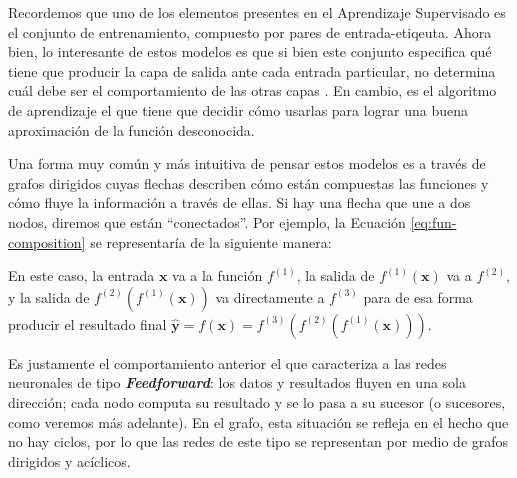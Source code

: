 \documentclass[../../main.tex]{subfiles}
\begin{document}
Recordemos que uno de los elementos presentes en el Aprendizaje Supervisado es el conjunto
de entrenamiento, compuesto por pares de entrada-etiqeuta. Ahora bien, lo interesante de
estos modelos es que si bien este conjunto especifica qué tiene que producir la capa de
salida ante cada entrada particular, no determina cuál debe ser el comportamiento de las
otras capas \cite{deep-learning}. En cambio, es el algoritmo de aprendizaje el que tiene
que decidir cómo usarlas para lograr una buena aproximación de la función desconocida.

Una forma muy común y más intuitiva de pensar estos modelos es a través de grafos
dirigidos cuyas flechas describen cómo están compuestas las funciones y cómo fluye la
información a través de ellas. Si hay una flecha que une a dos nodos, diremos que están
``conectados''. Por ejemplo, la Ecuación \ref{eq:fun-composition} se representaría de la
siguiente manera:
\begin{center}
\end{center}

En este caso, la entrada \(\bm{x}\) va a la función \(f^{(1)}\), la salida de
\(f^{(1)}(\bm{x})\) va a \(f^{(2)}\), y la salida de \(f^{(2)}(f^{(1)}(\bm{x}))\)
va directamente a \(f^{(3)}\) para de esa forma producir el resultado final \(\bm{\hat{y}} =
f(\bm{x}) = f^{(3)}(f^{(2)}(f^{(1)}(\bm{x})))\).

Es justamente el comportamiento anterior el que caracteriza a las redes neuronales de tipo
\textbf{\textit{Feedforward}}: los datos y resultados fluyen en una sola dirección; cada
nodo computa su resultado y se lo pasa a su sucesor (o sucesores, como veremos más
adelante). En el grafo, esta situación se refleja en el hecho que no hay ciclos, por lo
que las redes de este tipo se representan por medio de grafos dirigidos y acíclicos.
\end{document}
